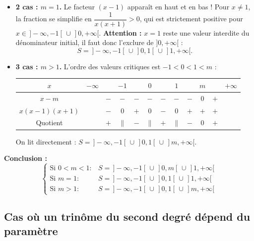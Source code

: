 \begin{exemple}
\begin{enumerate}
\begin{itemize}
        \item \textbf{2\ieme{} cas : $m = 1$.} Le facteur $(x - 1)$ apparaît en haut et en bas ! Pour $x \neq 1$, la fraction se simplifie en $\dfrac{1}{x(x + 1)} > 0$, qui est strictement positive pour $x \in \,]-\infty, -1[ \,\cup\, ]0, +\infty[$. \textbf{Attention :} $x = 1$ reste une valeur interdite du dénominateur initial, il faut donc l'exclure de $]0, +\infty[$ :
        \[
            S = \,]-\infty, -1[ \,\cup\, ]0, 1[ \,\cup\, ]1, +\infty[.
        \]

        \item \textbf{3\ieme{} cas : $m > 1$.} L'ordre des valeurs critiques est $-1 < 0 < 1 < m$ :
        \begin{center}
        \renewcommand{\arraystretch}{1.2}
        \begin{tabular}{c|ccccccccccc}
            $x$ & $-\infty$ & & $-1$ & & $0$ & & $1$ & & $m$ & & $+\infty$ \\ \hline
            $x - m$ & & $-$ & $-$ & $-$ & $-$ & $-$ & $-$ & $-$ & $0$ & $+$ & \\
            $x(x-1)(x+1)$ & & $-$ & $0$ & $+$ & $0$ & $-$ & $0$ & $+$ & $+$ & $+$ & \\ \hline
            Quotient & & $+$ & $\|$ & $-$ & $\|$ & $+$ & $\|$ & $-$ & $0$ & $+$ &
        \end{tabular}
        \end{center}
        On lit directement : $S = \,]-\infty, -1[ \,\cup\, ]0, 1[ \,\cup\, ]m, +\infty[$.
    \end{itemize}
\end{enumerate}
\textbf{Conclusion :}
\[
    \boxed{\begin{cases}
        \text{Si } 0 < m < 1 : & S = \,]-\infty, -1[ \,\cup\, ]0, m[ \,\cup\, ]1, +\infty[ \\
        \text{Si } m = 1 : & S = \,]-\infty, -1[ \,\cup\, ]0, 1[ \,\cup\, ]1, +\infty[ \\
        \text{Si } m > 1 : & S = \,]-\infty, -1[ \,\cup\, ]0, 1[ \,\cup\, ]m, +\infty[
    \end{cases}}
\]
\end{exemple}

\subsection{Cas où un trinôme du second degré dépend du paramètre}

